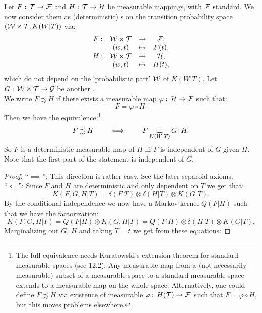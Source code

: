 \begin{Lem}
    Let $F:\, \mathcal{T} \to \mathcal{F}$ and $H:\,\mathcal{T} \to \mathcal{H}$ be measurable mappings, with $\mathcal{F}$ standard.
    We now consider them as (deterministic) \trv{}s on the transition probability space $(\mathcal{W} \times \mathcal{T},K(W|T))$ via:
    \[\begin{array}{ccccc} 
        F: & \mathcal{W}  \times \mathcal{T} &\to &\mathcal{F},\\
           &(w,t) &\mapsto& F(t), \\
        H: & \mathcal{W}  \times \mathcal{T} &\to &\mathcal{H},\\
           &(w,t) &\mapsto& H(t), \\
    \end{array}\]
    which do not depend on the 'probabilistic part' $\mathcal{W}$ of $K(W|T)$. Let $G:\, \mathcal{W} \times \mathcal{T} \to \mathcal{G}$ be another \trv{}.\\
    We write $F \precsim H$ if there exists a measurable map $\varphi:\,\mathcal{H} \to \mathcal{F}$ such that:
    \[ F = \varphi \circ H. \]
    Then we have the equivalence:\footnote{The full equivalence needs Kuratowski's extension theorem for standard measurable spaces
    (see \cite{Kec95} 12.2): Any measurable map from a (not necessarily measurable) subset of a measurable space to a standard measurable space extends to a measurable map on the whole space. Alternatively, one could define $F \precsim H$ via existence of measurable $\varphi:\, H(\mathcal{T}) \to \mathcal{F}$ such that $F=\varphi \circ H$, but this moves problems elsewhere.}
    \[ F \precsim H \qquad \iff\qquad F \operatorname*{\perp\mkern-11mu\perp}_{K(W|T)} G \operatorname*{|} H.\]
    So $F$ is a deterministic measurable map of $H$ iff $F$ is independent of $G$ given $H$. Note that the first part of the statement is independent of $G$.%
\begin{proof}
 ``$\implies$'': This direction is rather easy. See the later separoid axioms.\\
 ``$\Longleftarrow$'': Since $F$ and $H$ are deterministic and only dependent on $T$ we get that:
    \[ K(F,G,H|T) = \delta(F|T) \otimes \delta(H|T) \otimes K(G|T).  \]
    By the conditional independence we now have a Markov kernel $Q(F|H)$ such that we have the factorization:
    \[ K(F,G,H|T) = Q(F|H) \otimes K(G,H|T) = Q(F|H) \otimes \delta(H|T) \otimes K(G|T).  \]
    Marginalizing out $G$, $H$ and taking $T=t$ we get from these equations:

\end{proof}
\end{Lem}
